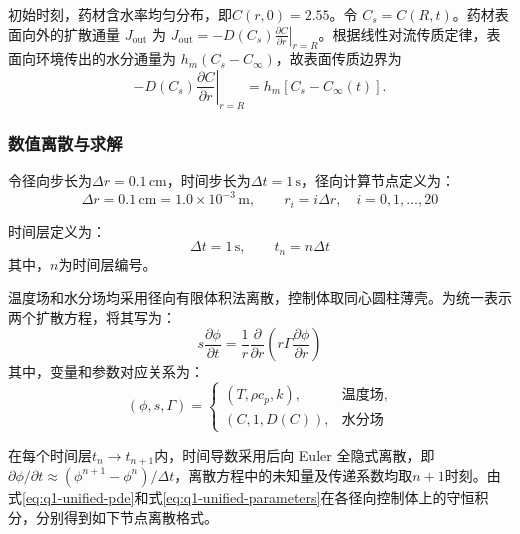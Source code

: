 \documentclass[withoutpreface,bwprint]{cumcmthesis}
\begin{document}
初始时刻，药材含水率均匀分布，即$C(r,0)=2.55$。令 $C_s=C(R,t)$。药材表面向外的扩散通量 $J_{\mathrm{out}}$ 为 $J_{\mathrm{out}}=-D(C_s)\left.\frac{\partial C}{\partial r}\right|_{r=R}$。根据线性对流传质定律，表面向环境传出的水分通量为 $h_m(C_s-C_\infty)$，故表面传质边界为
\begin{equation}
-D(C_s)\left.\frac{\partial C}{\partial r}\right|_{r=R}
=h_m\left[C_s-C_\infty(t)\right].
  \label{eq:q1-surface-moisture-flux}
\end{equation}

\subsubsection{数值离散与求解}

令径向步长为$\Delta r=0.1\,\mathrm{cm}$，时间步长为$\Delta t=1\,\mathrm{s}$，径向计算节点定义为：
\begin{equation}
\Delta r=0.1\,\mathrm{cm}=1.0\times10^{-3}\,\mathrm{m},
\qquad
r_i=i\Delta r,\quad i=0,1,\ldots,20
\label{eq:q1-space-grid}
\end{equation}

时间层定义为：
\begin{equation}
\Delta t=1\,\mathrm{s},
\qquad
t_n=n\Delta t
\label{eq:q1-time-grid}
\end{equation}
其中，$n$为时间层编号。


温度场和水分场均采用径向有限体积法离散，控制体取同心圆柱薄壳。为统一表示两个扩散方程，将其写为：
\begin{equation}
s\frac{\partial\phi}{\partial t}
=
\frac{1}{r}
\frac{\partial}{\partial r}
\left(
r\Gamma\frac{\partial\phi}{\partial r}
\right)
\label{eq:q1-unified-pde}
\end{equation}
其中，变量和参数对应关系为：
\begin{equation}
(\phi,s,\Gamma)=
\begin{cases}
(T,\rho c_p,k),&\text{温度场},\\
(C,1,D(C)),&\text{水分场}
\end{cases}
\label{eq:q1-unified-parameters}
\end{equation}

在每个时间层$t_n\rightarrow t_{n+1}$内，时间导数采用后向 Euler 全隐式离散，即$\partial\phi/\partial t\approx(\phi^{n+1}-\phi^n)/\Delta t$，离散方程中的未知量及传递系数均取$n+1$时刻。由式\eqref{eq:q1-unified-pde}和式\eqref{eq:q1-unified-parameters}在各径向控制体上的守恒积分，分别得到如下节点离散格式。
\end{document}
